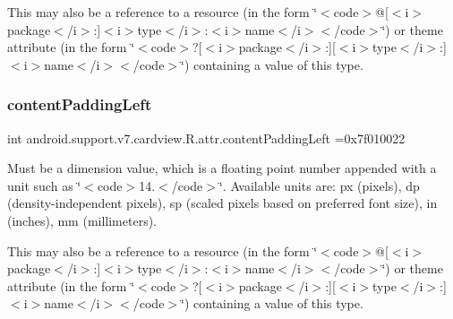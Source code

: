 This may also be a reference to a resource (in the form \char`\"{}$<$code$>$@\mbox{[}$<$i$>$package$<$/i$>$\+:\mbox{]}$<$i$>$type$<$/i$>$\+:$<$i$>$name$<$/i$>$$<$/code$>$\char`\"{}) or theme attribute (in the form \char`\"{}$<$code$>$?\mbox{[}$<$i$>$package$<$/i$>$\+:\mbox{]}\mbox{[}$<$i$>$type$<$/i$>$\+:\mbox{]}$<$i$>$name$<$/i$>$$<$/code$>$\char`\"{}) containing a value of this type. \mbox{\label{classandroid_1_1support_1_1v7_1_1cardview_1_1R_1_1attr_a3a740be3cc8e533e2464bdbc5541f153}} 
\subsubsection{\texorpdfstring{content\+Padding\+Left}{contentPaddingLeft}}
{\footnotesize\ttfamily int android.\+support.\+v7.\+cardview.\+R.\+attr.\+content\+Padding\+Left =0x7f010022\hspace{0.3cm}{\ttfamily [static]}}

Must be a dimension value, which is a floating point number appended with a unit such as \char`\"{}$<$code$>$14.\+5sp$<$/code$>$\char`\"{}. Available units are\+: px (pixels), dp (density-\/independent pixels), sp (scaled pixels based on preferred font size), in (inches), mm (millimeters). 

This may also be a reference to a resource (in the form \char`\"{}$<$code$>$@\mbox{[}$<$i$>$package$<$/i$>$\+:\mbox{]}$<$i$>$type$<$/i$>$\+:$<$i$>$name$<$/i$>$$<$/code$>$\char`\"{}) or theme attribute (in the form \char`\"{}$<$code$>$?\mbox{[}$<$i$>$package$<$/i$>$\+:\mbox{]}\mbox{[}$<$i$>$type$<$/i$>$\+:\mbox{]}$<$i$>$name$<$/i$>$$<$/code$>$\char`\"{}) containing a value of this type. \mbox{\label{classandroid_1_1support_1_1v7_1_1cardview_1_1R_1_1attr_a0853e7e5200f341f20030708dafe98c5}} 

